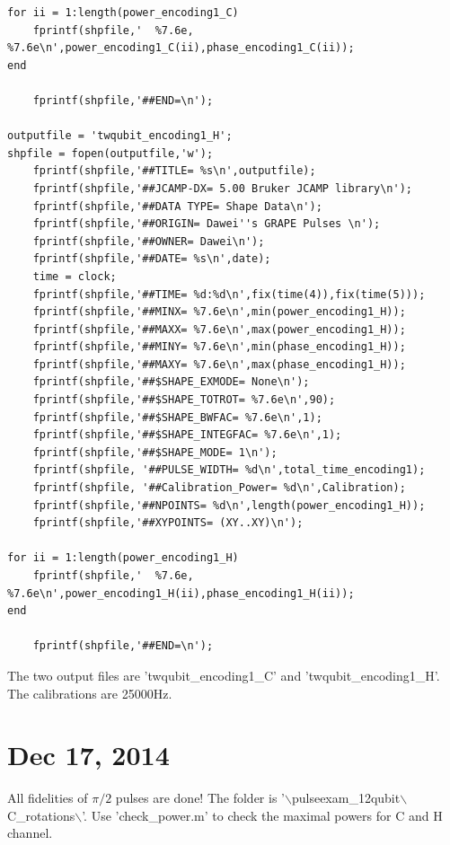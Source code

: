 \documentclass[prl,onecolumn]{revtex4-1}
\newcommand{\dir}{$\backslash$}
\begin{document}
\begin{lstlisting}
for ii = 1:length(power_encoding1_C)
    fprintf(shpfile,'  %7.6e,  %7.6e\n',power_encoding1_C(ii),phase_encoding1_C(ii));
end

    fprintf(shpfile,'##END=\n');

outputfile = 'twqubit_encoding1_H';
shpfile = fopen(outputfile,'w');
    fprintf(shpfile,'##TITLE= %s\n',outputfile);
    fprintf(shpfile,'##JCAMP-DX= 5.00 Bruker JCAMP library\n');
    fprintf(shpfile,'##DATA TYPE= Shape Data\n');
    fprintf(shpfile,'##ORIGIN= Dawei''s GRAPE Pulses \n');
    fprintf(shpfile,'##OWNER= Dawei\n');
    fprintf(shpfile,'##DATE= %s\n',date);
    time = clock;
    fprintf(shpfile,'##TIME= %d:%d\n',fix(time(4)),fix(time(5)));
    fprintf(shpfile,'##MINX= %7.6e\n',min(power_encoding1_H));
    fprintf(shpfile,'##MAXX= %7.6e\n',max(power_encoding1_H));
    fprintf(shpfile,'##MINY= %7.6e\n',min(phase_encoding1_H));
    fprintf(shpfile,'##MAXY= %7.6e\n',max(phase_encoding1_H));
    fprintf(shpfile,'##$SHAPE_EXMODE= None\n');
    fprintf(shpfile,'##$SHAPE_TOTROT= %7.6e\n',90);
    fprintf(shpfile,'##$SHAPE_BWFAC= %7.6e\n',1);
    fprintf(shpfile,'##$SHAPE_INTEGFAC= %7.6e\n',1);
    fprintf(shpfile,'##$SHAPE_MODE= 1\n');
    fprintf(shpfile, '##PULSE_WIDTH= %d\n',total_time_encoding1);
    fprintf(shpfile, '##Calibration_Power= %d\n',Calibration);
    fprintf(shpfile,'##NPOINTS= %d\n',length(power_encoding1_H));
    fprintf(shpfile,'##XYPOINTS= (XY..XY)\n');

for ii = 1:length(power_encoding1_H)
    fprintf(shpfile,'  %7.6e,  %7.6e\n',power_encoding1_H(ii),phase_encoding1_H(ii));
end

    fprintf(shpfile,'##END=\n');
\end{lstlisting}

The two output files are 'twqubit\_encoding1\_C' and 'twqubit\_encoding1\_H'. The calibrations are 25000Hz.

\newpage
\section{Dec 17, 2014}

All fidelities of $\pi/2$ pulses are done! The folder is '\dir pulseexam\_12qubit\dir C\_rotations\dir'. Use 'check\_power.m' to check the maximal powers for C and H channel.
\end{document}
